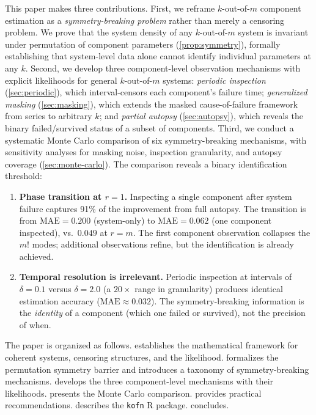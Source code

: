 \documentclass[12pt]{article}
\newcommand{\MAE}{\mathrm{MAE}}
\begin{document}
This paper makes three contributions.
%
First, we reframe $k$-out-of-$m$ component estimation as a
\emph{symmetry-breaking problem} rather than merely a censoring problem.
We prove that the system density of any $k$-out-of-$m$ system is invariant
under permutation of component parameters (\cref{prop:symmetry}), formally
establishing that system-level data alone cannot identify individual
parameters at any $k$.
%
Second, we develop three component-level observation mechanisms with explicit
likelihoods for general $k$-out-of-$m$ systems:
\emph{periodic inspection} (\cref{sec:periodic}), which interval-censors
each component's failure time;
\emph{generalized masking} (\cref{sec:masking}), which extends the masked
cause-of-failure framework from series to arbitrary $k$; and
\emph{partial autopsy} (\cref{sec:autopsy}), which reveals the binary
failed/survived status of a subset of components.
%
Third, we conduct a systematic Monte Carlo comparison of six
symmetry-breaking mechanisms, with sensitivity analyses for masking noise,
inspection granularity, and autopsy coverage (\cref{sec:monte-carlo}).
The comparison reveals a binary identification threshold:
\begin{enumerate}
  \item \textbf{Phase transition at $r=1$.}  Inspecting a single component
    after system failure captures 91\% of the improvement from full autopsy.
    The transition is from $\MAE = 0.200$ (system-only) to $\MAE = 0.062$
    (one component inspected), vs.\ $0.049$ at $r = m$.  The first
    component observation collapses the $m!$ modes; additional observations
    refine, but the identification is already achieved.
  \item \textbf{Temporal resolution is irrelevant.}  Periodic inspection at
    intervals of $\delta = 0.1$ versus $\delta = 2.0$ (a $20\times$ range
    in granularity) produces identical estimation accuracy
    ($\MAE \approx 0.032$).  The symmetry-breaking information is the
    \emph{identity} of a component (which one failed or survived), not
    the precision of when.
\end{enumerate}

The paper is organized as follows.   establishes the
mathematical framework for coherent systems, censoring structures, and the
likelihood.   formalizes the permutation symmetry barrier
and introduces a taxonomy of symmetry-breaking mechanisms.
 develops the three component-level mechanisms with
their likelihoods.   presents the Monte Carlo
comparison.   provides practical recommendations.
 describes the \texttt{kofn} R package.
 concludes.
\end{document}

